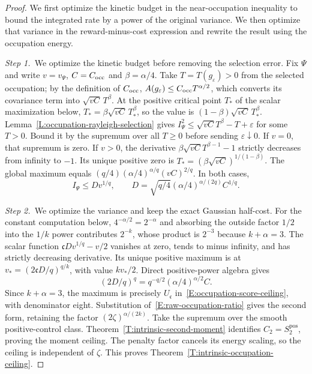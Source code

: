 \begin{proof}
  We first optimize the kinetic budget in the near-occupation inequality to
  bound the integrated rate by a power of the original variance. We then
  optimize that variance in the reward-minus-cost expression and rewrite the
  result using the occupation energy.


  \medskip
  \noindent\textit{Step 1.~}We optimize the kinetic budget before removing the
  selection error.
  Fix $\Psi$ and write $v = v_\Psi$, $C = C_{\rm occ}$ and $\beta = \alpha/4$.
  Take $T=T(g_\varepsilon)>0$ from the selected occupation; by the definition
  of $C_{\rm occ}$, $A(g_\varepsilon)\le C_{\rm occ}T^{\alpha/2}$, which
  converts its covariance term into $\sqrt{vC}\,T^\beta$.
  At the positive critical point $T_*$ of the scalar maximization below,
  $T_*=\beta\sqrt{vC}\,T_*^\beta$, so the value is
  $(1-\beta)\sqrt{vC}\,T_*^\beta$.
  Lemma~\ref{L:occupation-rayleigh-selection} gives $I_\Psi^2 \le
  \sqrt{vC}T^\beta-T+\varepsilon$ for some $T > 0$. Bound it by the supremum
  over all $T \ge 0$ before sending $\varepsilon\downarrow0$. If $v = 0$, that
  supremum is zero. If $v > 0$, the derivative $\beta\sqrt{vC}T^{\beta-1}-1$
  strictly decreases from infinity to $-1$. Its unique positive zero is $T_* =
  (\beta\sqrt{vC})^{1/(1-\beta)}$. The global maximum equals
  $(q/4)(\alpha/4)^{\alpha/q}(vC)^{2/q}$. In both cases,
  \[
    I_\Psi\le Dv^{1/q},\qquad
    D=\sqrt{q/4}(\alpha/4)^{\alpha/(2q)}C^{1/q}.
  \]

  \medskip
  \noindent\textit{Step 2.~}We optimize the variance and keep the exact
  Gaussian half-cost.
  For the constant computation below, $4^{-\alpha/2}=2^{-\alpha}$ and
  absorbing the outside factor $1/2$ into the $1/k$ power contributes
  $2^{-k}$, whose product is $2^{-3}$ because $k+\alpha=3$.
  The scalar function $\mathfrak{c} Dv^{1/q}-v/2$ vanishes at zero, tends to
  minus infinity, and has strictly decreasing derivative. Its unique positive
  maximum is at $v_* = (2\mathfrak{c} D/q)^{q/k}$, with value $kv_*/2$. Direct
  positive-power algebra gives
  \[
    (2D/q)^q=q^{-q/2}(\alpha/4)^{\alpha/2}C .
  \]
  Since $k+\alpha = 3$, the maximum is precisely $U_{\mathfrak{c}}$
  in~\eqref{E:occupation-score-ceiling}, with denominator eight. Substitution
  of~\eqref{E:raw-occupation-ratio} gives the second form, retaining the factor
  $(2\zeta)^{\alpha/(2k)}$. Take the supremum over the smooth positive-control
  class. Theorem~\ref{T:intrinsic-second-moment} identifies $C_2 =
  S_2^{\mathrm{pos}}$, proving the moment ceiling. The penalty factor cancels
  its energy scaling, so the ceiling is independent of $\zeta$. This proves
  Theorem~\ref{T:intrinsic-occupation-ceiling}.
\end{proof}

